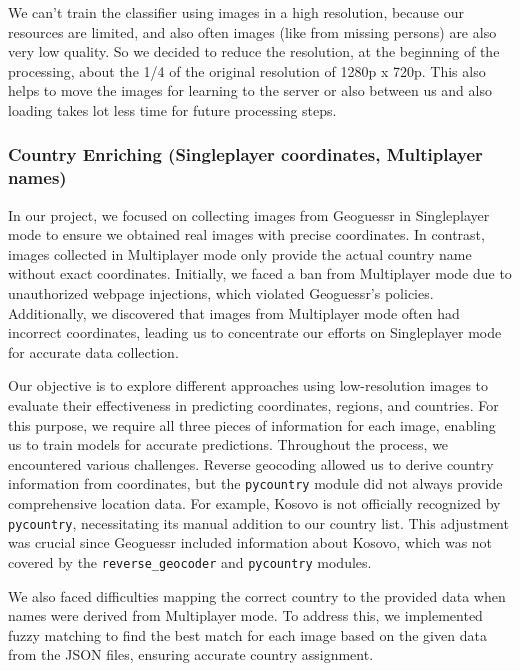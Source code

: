 \documentclass{article}
\begin{document}
We can't train the classifier using images in a high resolution, because
our resources are limited, and also often images (like from missing
persons) are also very low quality. So we decided to reduce the
resolution, at the beginning of the processing, about the 1/4 of the
original resolution of 1280p x 720p. This also helps to move the images
for learning to the server or also between us and also loading takes lot
less time for future processing steps.

\subsubsection{Country Enriching (Singleplayer coordinates, Multiplayer
names)}\label{country-enriching-singleplayer-coordinates-multiplayer-names}

In our project, we focused on collecting images from Geoguessr in
Singleplayer mode to ensure we obtained real images with precise
coordinates. In contrast, images collected in Multiplayer mode only
provide the actual country name without exact coordinates. Initially, we
faced a ban from Multiplayer mode due to unauthorized webpage
injections, which violated Geoguessr's policies. Additionally, we
discovered that images from Multiplayer mode often had incorrect
coordinates, leading us to concentrate our efforts on Singleplayer mode
for accurate data collection.

Our objective is to explore different approaches using low-resolution
images to evaluate their effectiveness in predicting coordinates,
regions, and countries. For this purpose, we require all three pieces of
information for each image, enabling us to train models for accurate
predictions. Throughout the process, we encountered various challenges.
Reverse geocoding allowed us to derive country information from
coordinates, but the \texttt{pycountry} module did not always provide
comprehensive location data. For example, Kosovo is not officially
recognized by \texttt{pycountry}, necessitating its manual addition to
our country list. This adjustment was crucial since Geoguessr included
information about Kosovo, which was not covered by the
\texttt{reverse\_geocoder} and \texttt{pycountry} modules.

We also faced difficulties mapping the correct country to the provided
data when names were derived from Multiplayer mode. To address this, we
implemented fuzzy matching to find the best match for each image based
on the given data from the JSON files, ensuring accurate country
assignment.
\end{document}
